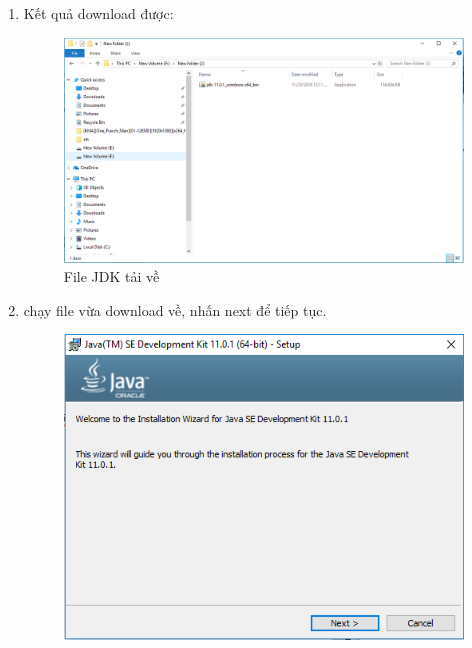 \begin{enumerate}
\begin{center}
\end{center}
\newpage
    \item Kết quả download được:
\begin{center}
    \begin{figure}[htp]
    \begin{center}
     \includegraphics[scale=0.5]{image3/downloadjdk}
    \end{center}
    \caption{File JDK tải về}
    \label{refhinh1}
    \end{figure}
\end{center}
    \item chạy file vừa download về, nhấn next để tiếp tục.
\newpage
\begin{center}
    \begin{figure}[htp]
    \begin{center}
     \includegraphics[scale=1.0]{image3/jdksetup}
    \end{center}

\end{figure}
\end{center}
\end{enumerate}
